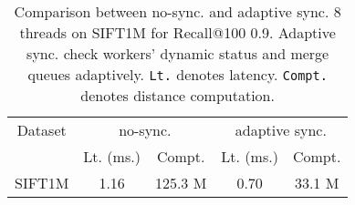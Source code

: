 \begin{table}[]
    \caption{Comparison between no-sync. and adaptive sync.
        \textmd{8 threads on SIFT1M for Recall@100 0.9. 
            Adaptive sync. check workers' dynamic status and merge queues adaptively.
            \texttt{Lt.} denotes latency. \texttt{Compt.} denotes distance computation.}}
    
    \label{tab:comp_no_sync_bulk_step}
    \begin{tabular}{|c|c|c|c|c|}
        \hline
        Dataset &               \multicolumn{2}{c|}{no-sync.}               &          \multicolumn{2}{c|}{adaptive sync.}           \\ \cline{2-5}
        &         Lt. (ms.)         &            Compt.            &         Lt. (ms.)         &           Compt.            \\ \hline\hline
        SIFT1M  & \multicolumn{1}{c|}{1.16} & \multicolumn{1}{c|}{125.3 M} & \multicolumn{1}{c|}{0.70} & \multicolumn{1}{c|}{33.1 M} \\ \hline
    \end{tabular}
\end{table}


